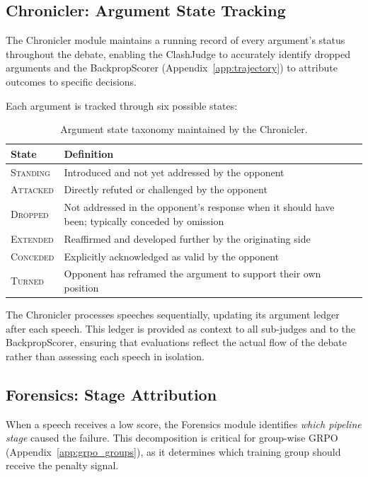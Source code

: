 \subsection{Chronicler: Argument State Tracking}

The Chronicler module maintains a running record of every argument's
status throughout the debate, enabling the ClashJudge to accurately
identify dropped arguments and the BackpropScorer
(Appendix~\ref{app:trajectory}) to attribute outcomes to specific
decisions.

Each argument is tracked through six possible states:

\begin{table}[h]
\centering
\small
\begin{tabular}{lp{8cm}}
\toprule
\textbf{State} & \textbf{Definition} \\
\midrule
\textsc{Standing} & Introduced and not yet addressed by the opponent \\
\textsc{Attacked} & Directly refuted or challenged by the opponent \\
\textsc{Dropped} & Not addressed in the opponent's response when it should have been; typically conceded by omission \\
\textsc{Extended} & Reaffirmed and developed further by the originating side \\
\textsc{Conceded} & Explicitly acknowledged as valid by the opponent \\
\textsc{Turned} & Opponent has reframed the argument to support their own position \\
\bottomrule
\end{tabular}
\caption{Argument state taxonomy maintained by the Chronicler.}
\label{tab:argument_states}
\end{table}

The Chronicler processes speeches sequentially, updating its argument
ledger after each speech. This ledger is provided as context to all
sub-judges and to the BackpropScorer, ensuring that evaluations reflect
the actual flow of the debate rather than assessing each speech in isolation.

\subsection{Forensics: Stage Attribution}

When a speech receives a low score, the Forensics module identifies
\emph{which pipeline stage} caused the failure. This decomposition is
critical for group-wise GRPO (Appendix~\ref{app:grpo_groups}), as it
determines which training group should receive the penalty signal.

